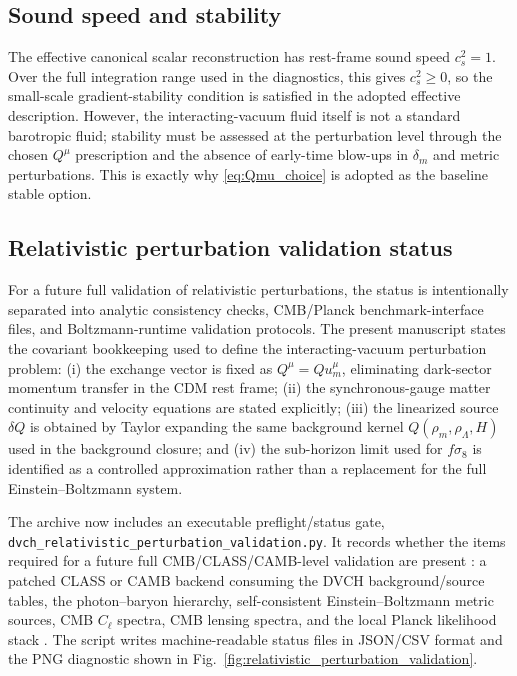 \documentclass[pdflatex,sn-mathphys-num]{sn-jnl}%
\begin{document}
\subsection{Sound speed and stability}
\label{subsec:soundspeed}

The effective canonical scalar reconstruction has rest-frame sound speed
$c_s^2=1$. Over the full integration range used in the diagnostics, this gives
$c_s^2\geq 0$, so the small-scale gradient-stability condition is satisfied in
the adopted effective description. However, the interacting-vacuum fluid itself
is not a standard barotropic
fluid; stability must be assessed at the perturbation level through the
chosen $Q^\mu$ prescription and the absence of early-time blow-ups in
$\delta_m$ and metric perturbations. This is exactly why \eqref{eq:Qmu_choice}
is adopted as the baseline stable option.

\subsection{Relativistic perturbation validation status}
\label{subsec:relativistic_perturbation_validation}

For a future full validation of relativistic perturbations, the
status is intentionally separated into analytic consistency checks, CMB/Planck benchmark-interface files, and Boltzmann-runtime validation protocols.
The present manuscript states the covariant bookkeeping used to define the interacting-vacuum perturbation problem:
(i) the exchange vector is fixed as $Q^\mu=Q u_m^\mu$, eliminating dark-sector
momentum transfer in the CDM rest frame; (ii) the synchronous-gauge matter
continuity and velocity equations are stated explicitly; (iii) the linearized
source $\delta Q$ is obtained by Taylor expanding the same background kernel
$Q(\rho_m,\rho_\Lambda,H)$ used in the background closure; and (iv) the
sub-horizon limit used for $f\sigma_8$ is identified as a controlled
approximation rather than a replacement for the full Einstein--Boltzmann
system.

The archive now includes an executable preflight/status gate,
\texttt{dvch\_relativistic\_perturbation\_validation.py}. It records whether the
items required for a future full CMB/CLASS/CAMB-level validation are present \cite{Blas:2011rf,Lewis:1999bs}: a patched CLASS or
CAMB backend consuming the DVCH background/source tables, the photon--baryon hierarchy,
self-consistent Einstein--Boltzmann metric sources, CMB $C_\ell$ spectra, CMB
lensing spectra, and the local Planck likelihood stack \cite{Planck:2019nip}. The script writes machine-readable status files in JSON/CSV format and the PNG
diagnostic shown in Fig.~\ref{fig:relativistic_perturbation_validation}.
\end{document}
